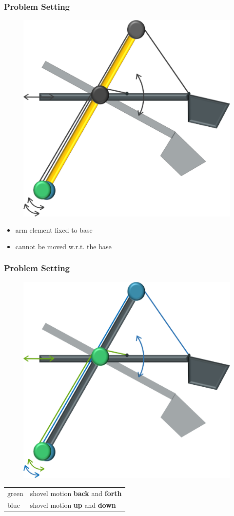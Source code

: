 \begin{frame}
	\frametitle{Problem Setting}
	\begin{figure}[bth]
		\centering
		\includegraphics[width=0.4\linewidth]{img/Problem_2}
	\end{figure}
	\begin{itemize}
		\item{arm element fixed to base}
		\item{cannot be moved w.r.t. the base}
	\end{itemize}
\end{frame}

\begin{frame}
	\frametitle{Problem Setting}
	\begin{figure}[bth]
		\centering
		\includegraphics[width=0.4\linewidth]{img/Problem_3}
	\end{figure}
	\centering
	\begin{tabular}{ll}
		\textcolor[rgb]{0,0.69,0.32}{green} & shovel motion \textbf{back} and \textbf{forth} \\
		\textcolor[rgb]{0.18,0.46,0.71}{blue} & shovel motion \textbf{up} and \textbf{down} \\
	\end{tabular}
\end{frame}

